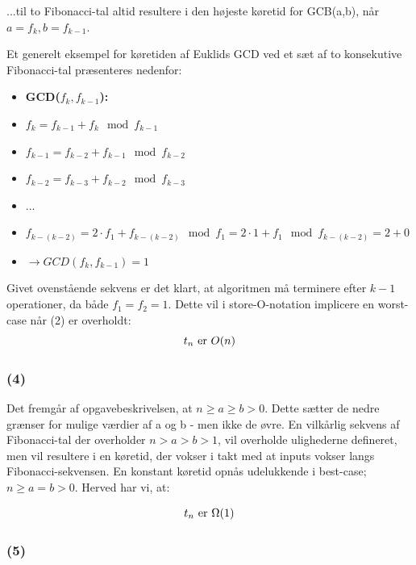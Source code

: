 \documentclass[a4paper,10pt]{article}
\begin{document}
...til to Fibonacci-tal altid resultere i den højeste køretid for GCB(a,b), når $a=f_{k}, b=f_{k-1}$.

Et generelt eksempel for køretiden af Euklids GCD ved et sæt af to konsekutive Fibonacci-tal præsenteres nedenfor:

\begin{itemize}
\item{\textbf{GCD($f_{k},f_{k-1}$):}}
\item{$f_{k} = f_{k-1} + f_{k} \mod f_{k-1}$}
\item{$f_{k-1} = f_{k-2} + f_{k-1} \mod f_{k-2}$}
\item{$f_{k-2} = f_{k-3} + f_{k-2} \mod f_{k-3}$}
\item{...}
\item{$f_{k-(k-2)} = 2 \cdot f_{1} + f_{k-(k-2)} \mod f_{1} = 2 \cdot 1 + f_{1} \mod f_{k-(k-2)} = 2 + 0$}
\item{$\rightarrow GCD(f_{k},f_{k-1}) = 1$}
\end{itemize}
Givet ovenstående sekvens er det klart, at algoritmen må terminere efter $k-1$ operationer, da både $f_{1} = f_{2} = 1$.  Dette vil i store-O-notation implicere en worst-case når (2) er overholdt:
$$
\text{$t_{n}$  er $ O(n)$}
$$

\subsubsection*{(4)}

Det fremgår af opgavebeskrivelsen, at $n \geq a \geq b > 0$. Dette sætter de nedre grænser for mulige værdier af a og b - men ikke de øvre. En vilkårlig sekvens af Fibonacci-tal der overholder $n > a > b > 1$, vil overholde ulighederne defineret, men vil resultere i en køretid, der vokser i takt med at inputs vokser langs Fibonacci-sekvensen. En konstant køretid opnås udelukkende i best-case; $n \geq a = b > 0$. Herved har vi, at:

$$
\text{$t_{n}$  er $ \Omega(1)$}
$$

\subsubsection*{(5)}
\end{document}
